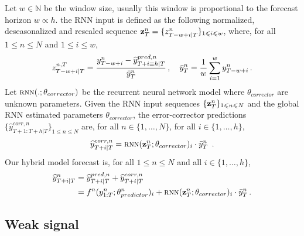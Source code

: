 \documentclass[lettersize,journal]{IEEEtran}
\newcommand{\ts}{y}
\newcommand{\tspred}{\widehat{\ts}}
\newcommand{\stat}{f}
\newcommand{\statparam}{\theta_{predictor}}
\newcommand{\lag}{h}
\newcommand{\window}{w}
\newcommand{\meants}{\Bar{\ts}}
\newcommand{\rnnwindow}{{\bf \rnninput}}
\newcommand{\rnninput}{z}
\newcommand{\rnn}{\textsc{rnn}}
\newcommand{\rnnparam}{\theta_{corrector}}
\begin{document}
Let $\window \in \mathbb{N}$ be the window size, usually this window is proportional to the forecast horizon $\window \propto \lag$. the RNN input is defined as the following  normalized, deseasonalized and rescaled sequence $\rnnwindow^n_T = \{\rnninput^{n}_{T-\window+i|T}\}_{1\leqslant i \leqslant w}$, where, for all $1\leqslant n \leqslant N$ and $1\leqslant i \leqslant w$, 
$$
\rnninput^{n,T}_{T-w+i|T} = \frac{\ts^n_{T-w+i} -\tspred^{pred,n}_{T+i \equiv h|T}}{\meants^n_T}\,,\quad \meants^n_T = \frac{1}{w}\sum_{i = 1}^{w}\ts^n_{T-w+i}\,.
$$
Let $\rnn(.;\rnnparam)$ be the recurrent neural network model where $\rnnparam$ are  unknown parameters. Given the RNN input sequences $\{\rnnwindow^n_T\}_{1\leqslant n \leqslant N}$ and the global RNN estimated parameters $\rnnparam$, the error-corrector predictions $\{\tspred^{corr,n}_{T+1:T+\lag|T}\}_{1\leqslant n \leqslant N}$ are, for all $n \in \{1,\ldots,N\}$, for all $i \in \{1,\ldots,\lag\}$,
$$
\tspred^{corr,n}_{T+i|T} = \rnn(\rnnwindow^n_T;\rnnparam)_i \cdot \meants^n_T\ \,.
$$
Our hybrid model forecast is, for all $1\leqslant n \leqslant N$ and all $i \in \{1,\ldots,\lag\}$,
\begin{align}
\label{eq:nows:full:model}
\tspred^n_{T+i|T}  &= \tspred^{pred,n}_{T+i|T} +  \tspred^{corr,n}_{T+i|T} \\
&= \stat^n(\ts^n_{1:T};\statparam^n)_i +  \rnn(\rnnwindow^n_T;\rnnparam)_i \cdot \meants^n_T\,.\nonumber
\end{align}


\subsection{Weak signal}
\end{document}
